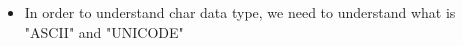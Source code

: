 

\begin{flushleft}
	
	\begin{itemize}
		\item In order to understand char data type, we need to understand what is "ASCII" and "UNICODE"
		
	\end{itemize}
	
\end{flushleft}


